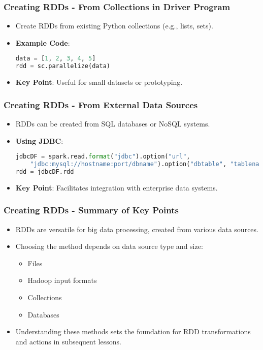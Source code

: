 \documentclass[aspectratio=169]{beamer}
\begin{document}
\begin{frame}[fragile]
    \frametitle{Creating RDDs - From Collections in Driver Program}
    \begin{itemize}
        \item Create RDDs from existing Python collections (e.g., lists, sets).
        \item \textbf{Example Code}:
        \begin{lstlisting}[language=Python]
data = [1, 2, 3, 4, 5]
rdd = sc.parallelize(data)
        \end{lstlisting}
        \item \textbf{Key Point}: Useful for small datasets or prototyping.
    \end{itemize}
\end{frame}

\begin{frame}[fragile]
    \frametitle{Creating RDDs - From External Data Sources}
    \begin{itemize}
        \item RDDs can be created from SQL databases or NoSQL systems.
        \item \textbf{Using JDBC}:
        \begin{lstlisting}[language=Python]
jdbcDF = spark.read.format("jdbc").option("url", 
    "jdbc:mysql://hostname:port/dbname").option("dbtable", "tablename").load()
rdd = jdbcDF.rdd
        \end{lstlisting}
        \item \textbf{Key Point}: Facilitates integration with enterprise data systems.
    \end{itemize}
\end{frame}

\begin{frame}[fragile]
    \frametitle{Creating RDDs - Summary of Key Points}
    \begin{itemize}
        \item RDDs are versatile for big data processing, created from various data sources.
        \item Choosing the method depends on data source type and size:
            \begin{itemize}
                \item Files
                \item Hadoop input formats
                \item Collections
                \item Databases
            \end{itemize}
        \item Understanding these methods sets the foundation for RDD transformations and actions in subsequent lessons.
    \end{itemize}
\end{frame}
\end{document}
